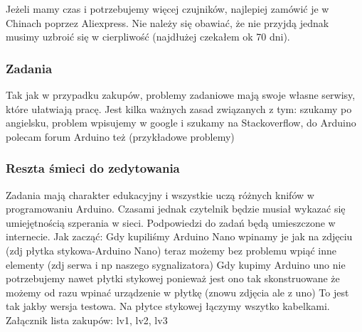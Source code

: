 Jeżeli mamy czas i potrzebujemy więcej czujników, najlepiej zamówić je w Chinach poprzez Aliexpress. Nie należy się obawiać, że nie przyjdą jednak musimy uzbroić się w cierpliwość (najdłużej czekałem ok 70 dni).

\subsubsection{Zadania}
Tak jak w przypadku zakupów, problemy zadaniowe mają swoje własne serwisy, które ułatwiają pracę. Jest kilka ważnych zasad związanych z tym: szukamy po angielsku, problem wpisujemy w google i szukamy na Stackoverflow, do Arduino polecam forum Arduino też (przykładowe problemy)
\subsubsection{Reszta śmieci do zedytowania}
Zadania mają charakter edukacyjny i wszystkie uczą różnych knifów w programowaniu Arduino. Czasami jednak czytelnik będzie musiał wykazać się umiejętnością szperania w sieci. Podpowiedzi do zadań będą umieszczone w internecie.
Jak zacząć:
Gdy kupiliśmy Arduino Nano wpinamy je jak na zdjęciu (zdj płytka stykowa-Arduino Nano) teraz możemy bez problemu wpiąć inne elementy (zdj serwa i np naszego sygnalizatora)
Gdy kupimy Arduino uno nie potrzebujemy nawet płytki stykowej ponieważ jest ono tak skonstruowane że możemy od razu wpinać urządzenie w płytkę
(znowu zdjęcia ale z uno)
To jest tak jakby wersja testowa. Na płytce stykowej łączymy wszytko kabelkami.
Załącznik lista zakupów: lv1, lv2, lv3

